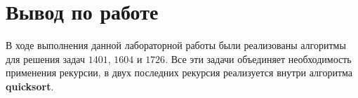 \documentclass[a5paper, 10pt]{article}
\theoremstyle{definition}
\theoremstyle{plain}
\theoremstyle{remark}
\begin{document}
\newpage
\section{Вывод по работе}
В ходе выполнения данной лабораторной работы были реализованы алгоритмы для решения задач $1401$, $1604$ и $1726$. Все эти задачи объединяет необходимость применения рекурсии, в двух последних рекурсия реализуется внутри алгоритма \textbf{quicksort}.
\end{document}
